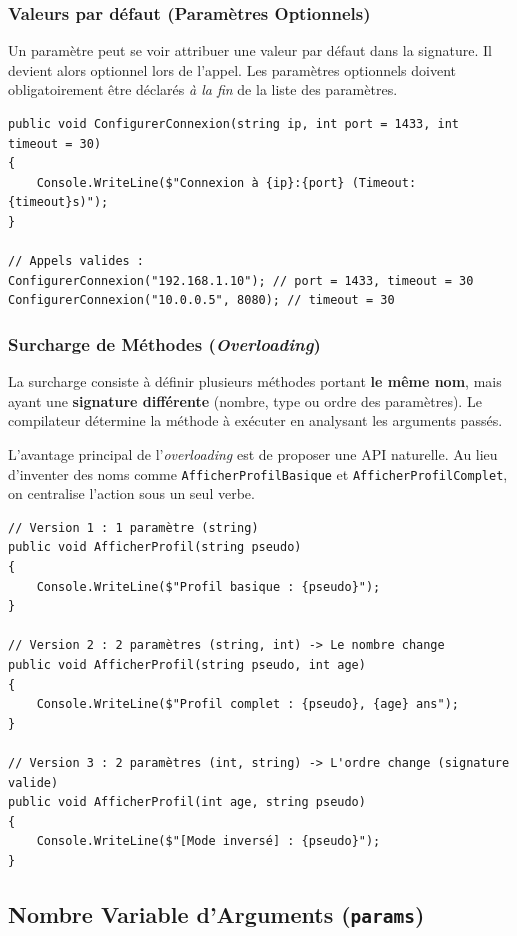 \subsubsection{Valeurs par défaut (Paramètres Optionnels)}
Un paramètre peut se voir attribuer une valeur par défaut dans la signature. Il devient alors optionnel lors de l'appel. Les paramètres optionnels doivent obligatoirement être déclarés \textit{à la fin} de la liste des paramètres.

\begin{lstlisting}[style=csharpstyle]
public void ConfigurerConnexion(string ip, int port = 1433, int timeout = 30)
{
    Console.WriteLine($"Connexion à {ip}:{port} (Timeout: {timeout}s)");
}

// Appels valides :
ConfigurerConnexion("192.168.1.10"); // port = 1433, timeout = 30
ConfigurerConnexion("10.0.0.5", 8080); // timeout = 30
\end{lstlisting}

\subsubsection{Surcharge de Méthodes (\textit{Overloading})}
La surcharge consiste à définir plusieurs méthodes portant \textbf{le même nom}, mais ayant une \textbf{signature différente} (nombre, type ou ordre des paramètres). Le compilateur détermine la méthode à exécuter en analysant les arguments passés.

L'avantage principal de l'\textit{overloading} est de proposer une API naturelle. Au lieu d'inventer des noms comme \texttt{AfficherProfilBasique} et \texttt{AfficherProfilComplet}, on centralise l'action sous un seul verbe.

\begin{lstlisting}[style=csharpstyle]
// Version 1 : 1 paramètre (string)
public void AfficherProfil(string pseudo)
{
    Console.WriteLine($"Profil basique : {pseudo}");
}

// Version 2 : 2 paramètres (string, int) -> Le nombre change
public void AfficherProfil(string pseudo, int age)
{
    Console.WriteLine($"Profil complet : {pseudo}, {age} ans");
}

// Version 3 : 2 paramètres (int, string) -> L'ordre change (signature valide)
public void AfficherProfil(int age, string pseudo)
{
    Console.WriteLine($"[Mode inversé] : {pseudo}");
}
\end{lstlisting}

\subsection{Nombre Variable d'Arguments (\texttt{params})}

